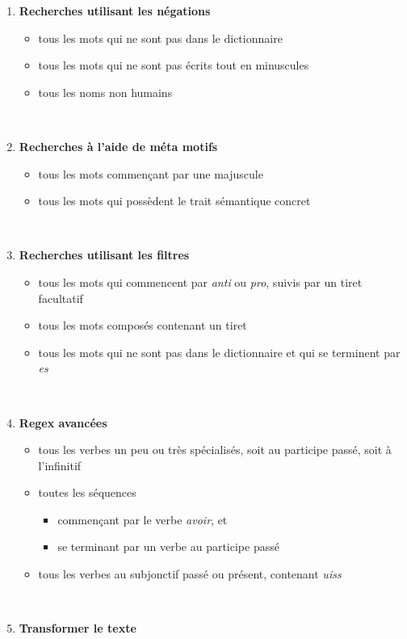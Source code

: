 \documentclass[xcolor={table,usenames,dvipsnames}]{article}
\begin{document}
\begin{enumerate}
\item \textbf{Recherches utilisant les négations}
\begin{itemize}
\item tous les mots qui ne sont pas dans le dictionnaire
\item tous les mots qui ne sont pas écrits tout en minuscules
\item tous les noms non humains
\end{itemize}
	\\
\bigskip

\item \textbf{Recherches à l'aide de méta motifs}
\begin{itemize}
	\item tous les mots commençant par une majuscule
	\item tous les mots qui possèdent le trait sémantique \og{}concret\fg{}
\end{itemize}
\\
\bigskip

\item \textbf{Recherches utilisant les filtres}
\begin{itemize}
	\item tous les mots qui commencent par \textit{anti} ou \textit{pro}, suivis par un tiret facultatif
	\item tous les mots composés contenant un tiret
	\item tous les mots qui ne sont pas dans le dictionnaire et qui se terminent par \textit{es}
\end{itemize}
\\
\bigskip
 
 \item \textbf{Regex avancées}
 \begin{itemize}
 	\item tous les verbes un peu ou très spécialisés, soit au participe passé, soit à l'infinitif
 	\item toutes les séquences
 	\begin{itemize}
 		\item commençant par le verbe \textit{avoir}, et
 		\item se terminant par un verbe au participe passé
 	\end{itemize}
 	\item tous les verbes au subjonctif passé ou présent, contenant \textit{uiss}
 \end{itemize}
\\
\bigskip
\item \textbf{Transformer le texte}


\end{enumerate}
\end{document}
